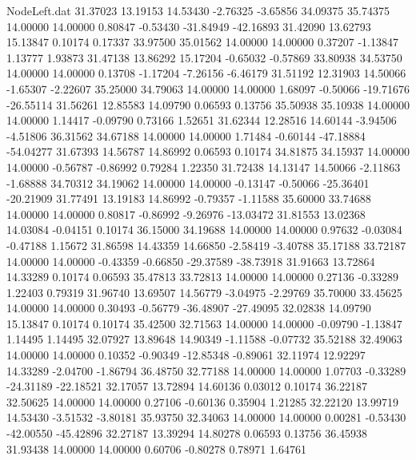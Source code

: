\begin{filecontents}{NodeLeft.dat}
  31.37023   13.19153   14.53430    -2.76325   -3.65856   34.09375   35.74375   14.00000   14.00000    0.80847   -0.53430  -31.84949  -42.16893
  31.42090   13.62793   15.13847     0.10174    0.17337   33.97500   35.01562   14.00000   14.00000    0.37207   -1.13847    1.13777    1.93873
  31.47138   13.86292   15.17204    -0.65032   -0.57869   33.80938   34.53750   14.00000   14.00000    0.13708   -1.17204   -7.26156   -6.46179
  31.51192   12.31903   14.50066    -1.65307   -2.22607   35.25000   34.79063   14.00000   14.00000    1.68097   -0.50066  -19.71676  -26.55114
  31.56261   12.85583   14.09790     0.06593    0.13756   35.50938   35.10938   14.00000   14.00000    1.14417   -0.09790    0.73166    1.52651
  31.62344   12.28516   14.60144    -3.94506   -4.51806   36.31562   34.67188   14.00000   14.00000    1.71484   -0.60144  -47.18884  -54.04277
  31.67393   14.56787   14.86992     0.06593    0.10174   34.81875   34.15937   14.00000   14.00000   -0.56787   -0.86992    0.79284    1.22350
  31.72438   14.13147   14.50066    -2.11863   -1.68888   34.70312   34.19062   14.00000   14.00000   -0.13147   -0.50066  -25.36401  -20.21909
  31.77491   13.19183   14.86992    -0.79357   -1.11588   35.60000   33.74688   14.00000   14.00000    0.80817   -0.86992   -9.26976  -13.03472
  31.81553   13.02368   14.03084    -0.04151    0.10174   36.15000   34.19688   14.00000   14.00000    0.97632   -0.03084   -0.47188    1.15672
  31.86598   14.43359   14.66850    -2.58419   -3.40788   35.17188   33.72187   14.00000   14.00000   -0.43359   -0.66850  -29.37589  -38.73918
  31.91663   13.72864   14.33289     0.10174    0.06593   35.47813   33.72813   14.00000   14.00000    0.27136   -0.33289    1.22403    0.79319
  31.96740   13.69507   14.56779    -3.04975   -2.29769   35.70000   33.45625   14.00000   14.00000    0.30493   -0.56779  -36.48907  -27.49095
  32.02838   14.09790   15.13847     0.10174    0.10174   35.42500   32.71563   14.00000   14.00000   -0.09790   -1.13847    1.14495    1.14495
  32.07927   13.89648   14.90349    -1.11588   -0.07732   35.52188   32.49063   14.00000   14.00000    0.10352   -0.90349  -12.85348   -0.89061
  32.11974   12.92297   14.33289    -2.04700   -1.86794   36.48750   32.77188   14.00000   14.00000    1.07703   -0.33289  -24.31189  -22.18521
  32.17057   13.72894   14.60136     0.03012    0.10174   36.22187   32.50625   14.00000   14.00000    0.27106   -0.60136    0.35904    1.21285
  32.22120   13.99719   14.53430    -3.51532   -3.80181   35.93750   32.34063   14.00000   14.00000    0.00281   -0.53430  -42.00550  -45.42896
  32.27187   13.39294   14.80278     0.06593    0.13756   36.45938   31.93438   14.00000   14.00000    0.60706   -0.80278    0.78971    1.64761

\end{filecontents}
